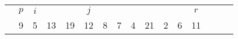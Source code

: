 \documentclass{standalone}
\begin{document}
\begin{tabular}{c|c|cWc|cWc|c|c|c|c|c|cWc|}
&
&
&
&
&
&
&
&
&
&
&
&
\\
&
9&
5&
13&
19&
12&
8&
7&
4&
21&
2&
6&
11
\end{tabular}
\end{document}
